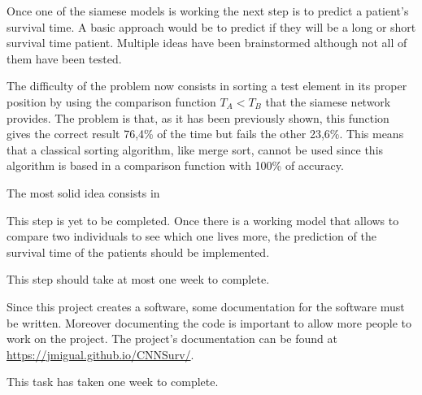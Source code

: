 
Once one of the siamese models is working the next step is to predict a patient's survival
time. A basic approach would be to predict if they will be a long or short survival time 
patient. Multiple ideas have been brainstormed although not all of them have been tested.

The difficulty of the problem now consists in sorting a test element in its proper position 
by using the comparison function \( T_A < T_B \) that the siamese network provides. 
The problem is that, as it has been previously shown, this function gives the correct 
result 76,4\% of the time but fails the other 23,6\%. This means that a classical sorting
algorithm, like merge sort, cannot be used since this algorithm is based in a comparison
function with 100\% of accuracy.

The most solid idea consists in 

This step is yet to be completed. Once there is a working model that allows to compare two 
individuals to see which one lives more, the prediction of the survival time of the patients 
should be implemented.

This step should take at most one week to complete.


Since this project creates a software, some documentation for the software must be written.
Moreover documenting the code is important to allow more people to work on the project.
The project's documentation can be found at \url{https://jmigual.github.io/CNNSurv/}.

This task has taken one week to complete.

